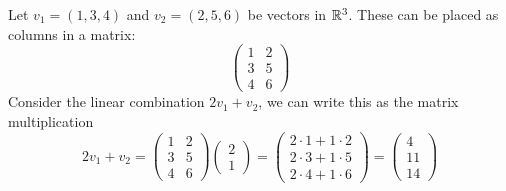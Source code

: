 \begin{example}
Let $v_1 = (1,3,4)$ and $v_2 = (2,5,6)$ be vectors in $\mathbb{R}^3$. These can be placed as columns in a matrix:
\[ \begin{pmatrix}
1 & 2 \\ 3 & 5 \\ 4 & 6
\end{pmatrix} \]
Consider the linear combination $2v_1 + v_2$, we can write this as the matrix multiplication
\[ 2v_1 + v_2 = \begin{pmatrix}
1 & 2 \\ 3 & 5 \\ 4 & 6
\end{pmatrix}\begin{pmatrix}
2 \\ 1
\end{pmatrix} = \begin{pmatrix}
2\cdot 1 + 1\cdot 2 \\
2\cdot 3 + 1\cdot 5 \\
2\cdot 4 + 1\cdot 6
\end{pmatrix} = \begin{pmatrix}
4 \\ 11 \\ 14
\end{pmatrix} \]
\end{example}
